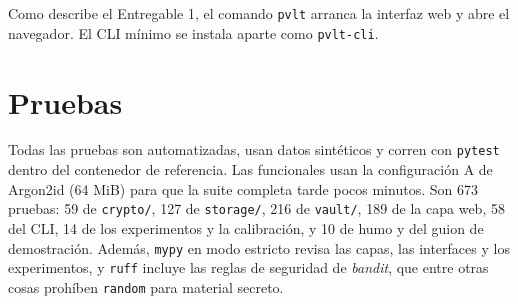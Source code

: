 \documentclass[11pt,letterpaper]{article}
\newcommand{\code}[1]{\texttt{#1}}
\newcommand{\pvlt}{\code{pvlt}}
\begin{document}
Como describe el Entregable 1, el comando \pvlt{} arranca la interfaz web y abre el navegador. El CLI mínimo se instala aparte como \code{pvlt-cli}.

\section{Pruebas}\label{sec:pruebas}

Todas las pruebas son automatizadas, usan datos sintéticos y corren con \code{pytest} dentro del contenedor de referencia. Las funcionales usan la configuración A de Argon2id (64 MiB) para que la suite completa tarde pocos minutos. Son 673 pruebas: 59 de \code{crypto/}, 127 de \code{storage/}, 216 de \code{vault/}, 189 de la capa web, 58 del CLI, 14 de los experimentos y la calibración, y 10 de humo y del guion de demostración. Además, \code{mypy} en modo estricto revisa las capas, las interfaces y los experimentos, y \code{ruff} incluye las reglas de seguridad de \emph{bandit}, que entre otras cosas prohíben \code{random} para material secreto.
\end{document}
